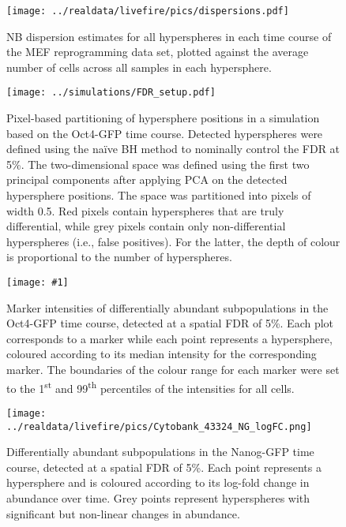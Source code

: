 \documentclass{article}
\begin{document}
\begin{figure}[p]
    \begin{center}
    \texttt{[image: ../realdata/livefire/pics/dispersions.pdf]}
    \end{center}
    \caption{NB dispersion estimates for all hyperspheres in each time course of the MEF reprogramming data set, plotted against the average number of cells across all samples in each hypersphere.}
\end{figure}

\begin{figure}[p]
    \begin{center}
        \texttt{[image: ../simulations/FDR\_setup.pdf]}
    \end{center}
    \caption{Pixel-based partitioning of hypersphere positions in a simulation based on the Oct4-GFP time course.
        Detected hyperspheres were defined using the na\"ive BH method to nominally control the FDR at 5\%.
        The two-dimensional space was defined using the first two principal components after applying PCA on the detected hypersphere positions.
        The space was partitioned into pixels of width 0.5.
        Red pixels contain hyperspheres that are truly differential, while grey pixels contain only non-differential hyperspheres (i.e., false positives).
        For the latter, the depth of colour is proportional to the number of hyperspheres.
    }
\end{figure}

\newcommand{\bigfigopt}[1]{\texttt{[image: \#1]}}

\begin{figure}[p]
    \begin{center}
    \bigfigopt{../realdata/livefire/pics/Cytobank_43324_4FI_markers.png}
    \end{center}
    \caption{
        Marker intensities of differentially abundant subpopulations in the Oct4-GFP time course, detected at a spatial FDR of 5\%.
        Each plot corresponds to a marker while each point represents a hypersphere, coloured according to its median intensity for the corresponding marker.
        The boundaries of the colour range for each marker were set to the 1\textsuperscript{st} and 99\textsuperscript{th} percentiles of the intensities for all cells.
    }
    \label{fig:oct4_markers}
\end{figure}

\begin{figure}[p]
    \begin{center}
    \texttt{[image: ../realdata/livefire/pics/Cytobank\_43324\_NG\_logFC.png]}
    \end{center}
    \caption{
        Differentially abundant subpopulations in the Nanog-GFP time course, detected at a spatial FDR of 5\%.
        Each point represents a hypersphere and is coloured according to its log-fold change in abundance over time.
        Grey points represent hyperspheres with significant but non-linear changes in abundance.
    }
\end{figure}
\end{document}
